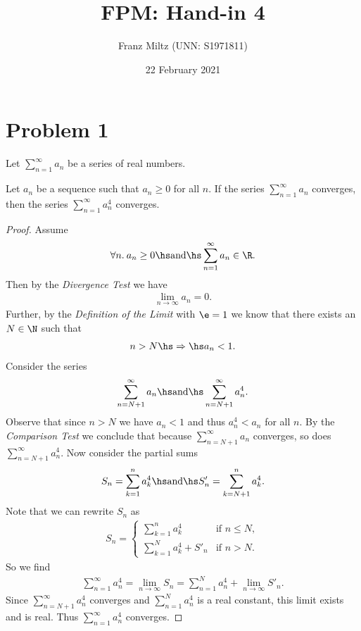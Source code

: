 \documentclass{article}
\begin{document}
\title{FPM: Hand-in 4}
\author{Franz Miltz (UNN: S1971811)}
\date{22 February 2021}
\maketitle

\section*{Problem 1}

Let $\sum_{n=1}^\infty a_n$ be a series of real numbers.

\setcounter{section}{1}
\begin{claim}
    Let $a_n$ be a sequence such that $a_n\geq 0$ for all $n$. If the
    series $\sum_{n=1}^\infty a_n$ converges, then the series
    $\sum_{n=1}^\infty a_n^4$ converges.
\end{claim}
\begin{proof}
    Assume \begin{align*}
        \forall n.\:a_n\geq 0\hs\text{and}\hs \sum_{n=1}^\infty a_n \in \R.
    \end{align*}
    Then by the \emph{Divergence Test} we have
    \begin{align*}
        \lim_{n\to\infty} a_n = 0.
    \end{align*}
    Further, by the \emph{Definition of the Limit} with $\e = 1$
    we know that there exists an $N\in\N$ such that
    \begin{align*}
        n > N\hs\Rightarrow\hs a_n < 1.
    \end{align*}
    Consider the series
    \begin{align*}
        \sum_{n=N+1}^\infty a_n \hs\text{and}\hs \sum_{n=N+1}^\infty a_n^4.
    \end{align*}
    Observe that since $n>N$ we have $a_n<1$ and thus $a_n^4 < a_n$ for all
    $n$. By the \emph{Comparison Test} we conclude that because
    $\sum_{n=N+1}^\infty a_n$ converges, so does $\sum_{n=N+1}^\infty a_n^4$.
    Now consider the partial sums
    \begin{align*}
        S_n = \sum_{k=1}^n a_k^4 \hs\text{and}\hs S'_n = \sum_{k=N+1}^n a_k^4.
    \end{align*}
    Note that we can rewrite $S_n$ as
    \begin{align*}
        S_n = \begin{cases}
            \sum_{k=1}^n a_k^4          & \text{if }n \leq N, \\
            \sum_{k=1}^{N} a_k^4 + S'_n & \text{if }n>N.
        \end{cases}
    \end{align*}
    So we find
    \begin{align*}
        \sum_{n=1}^\infty a_n^4 = \lim_{n\to\infty} S_n
        = \sum_{n=1}^N a_n^4 + \lim_{n\to\infty} S'_n.
    \end{align*}
    Since $\sum_{n=N+1}^\infty a_n^4$ converges and $\sum_{n=1}^N a_n^4$ is
    a real constant, this limit exists and is real. Thus $\sum_{n=1}^\infty a_n^4$ converges.
\end{proof}
\end{document}

